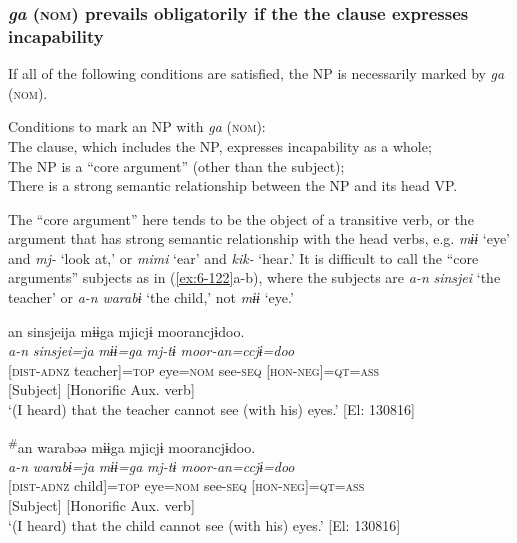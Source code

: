 \subsubsection{\textit{ga} (\textsc{nom}) prevails obligatorily if the the clause expresses incapability}

If all of the following conditions are satisfied, the NP is necessarily marked by \textit{ga} (\textsc{nom}).


\ea\label{ex:6-121}
 Conditions to mark an NP with \textit{ga} (\textsc{nom}):\\

\ea  The clause, which includes the NP, expresses incapability as a whole;\\
\ex The NP is a “core argument” (other than the subject);\\
\ex There is a strong semantic relationship between the NP and its head VP.\\
\z
\z

The “core argument” here tends to be the object of a transitive verb, or the argument that has strong semantic relationship with the head verbs, e.g. \textit{mɨɨ} ‘eye’ and \textit{mj-} ‘look at,’ or \textit{mimi} ‘ear’ and \textit{kik-} ‘hear.’ It is difficult to call the “core arguments” subjects as in (\ref{ex:6-122}a-b), where the subjects are \textit{a-n} \textit{sinsjei} ‘the teacher’ or \textit{a-n} \textit{warabɨ} ‘the child,’ not \textit{mɨɨ} ‘eye.’

\ea\label{ex:6-122}
\ea
{\TM}
\gllll an  sinsjeija  mɨɨga  mjicjɨ  moorancjɨdoo.\\
\textit{a-n}  \textit{sinsjei=ja}  \textit{mɨɨ=ga}  \textit{mj-tɨ}  \textit{moor-an=ccjɨ=doo}\\
      {}[\textsc{dist}-\textsc{adnz}  teacher]=\textsc{top}  eye=\textsc{nom}  see-\textsc{seq}  [\textsc{hon}-\textsc{neg}]=\textsc{qt}=\textsc{ass}\\
      {}[Subject]      [Honorific Aux. verb]\\
\glt ‘(I heard) that the teacher cannot see (with his) eyes.’ [El: 130816]

\ex
  {\TM}
  \glll \textsuperscript{\#}an  warabəə  mɨɨga  mjicjɨ  moorancjɨdoo.\\
       \textit{a-n}  \textit{warabɨ=ja}  \textit{mɨɨ=ga}  \textit{mj-tɨ}  \textit{moor-an=ccjɨ=doo}\\
      {}[\textsc{dist}-\textsc{adnz}  child]=\textsc{top}  eye=\textsc{nom}  see-\textsc{seq}  [\textsc{hon}-\textsc{neg}]=\textsc{qt}=\textsc{ass}\\
      {}[Subject]      [Honorific Aux. verb]\\
 ‘(I heard) that the child cannot see (with his) eyes.’ [El: 130816]
\z
\z

